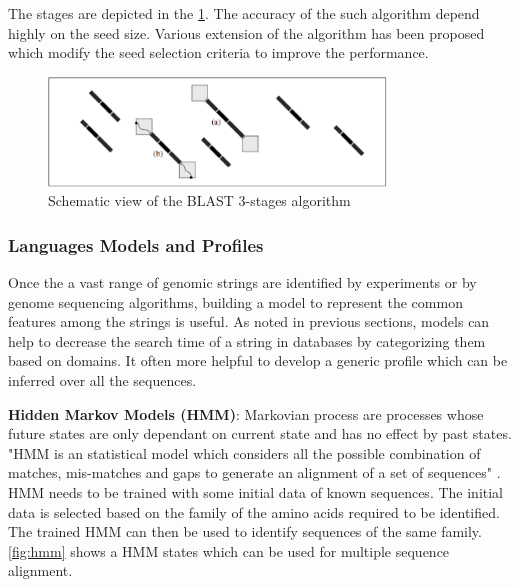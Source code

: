 \documentclass[12pt,twoside]{article}
\begin{document}
The stages are depicted in the \cref{fig:blastview}. The accuracy of the such algorithm depend highly on the seed size. Various extension of the algorithm has been proposed which
modify the seed selection criteria to improve the performance.

\begin{figure}[h]%
    \centering
    \includegraphics[width=0.8\textwidth]{fig/blastview}
    \caption{Schematic view of the BLAST 3-stages algorithm \cite[Figure 8.11]{gokhale_reconfigurable_2010}}
    \label{fig:blastview}
\end{figure}

\subsubsection{Languages Models and Profiles}

Once the a vast range of genomic strings are identified by experiments or by genome sequencing algorithms, building
a model to represent the common features among the strings is useful. As noted in previous sections, models can help
to decrease the search time of a string in databases by categorizing them based on domains. It often more helpful
to develop a generic profile which can be inferred over all the sequences.

\begin{flushleft}
\textbf{Hidden Markov Models (HMM)}: Markovian process are processes whose future states are only dependant on current state and has no effect by past states.
"HMM \cite{hughey_hidden_1996} is an statistical model which considers all the possible combination of matches, mis-matches and gaps to generate an
alignment of a set of sequences" \cite{mount_bioinformatics:_2004}. HMM needs to be trained with some initial data of known
sequences. The initial data is selected based on the family of the amino acids required to be identified. The trained HMM 
can then be used to identify sequences of the same family. \cref{fig:hmm} shows a HMM states which can be used for multiple
sequence alignment.
\end{flushleft}
\end{document}
